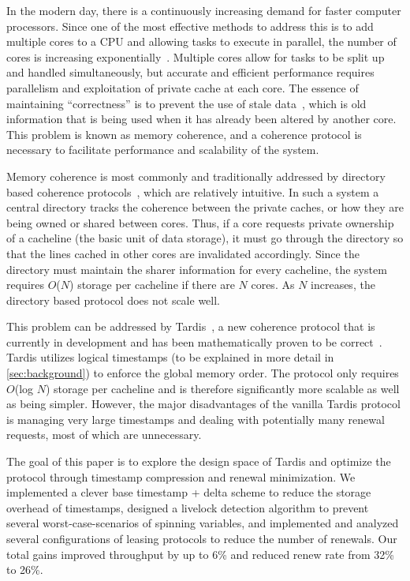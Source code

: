 \documentclass[12pt]{article}
\begin{document}
In the modern day, there is a continuously increasing demand for 
faster computer processors. Since one of the most effective methods to 
address this is to add multiple cores to a CPU and allowing tasks to 
execute in parallel, the number of cores is increasing 
exponentially~\cite{tilera, xeonphi}. 
% 
Multiple cores allow for tasks to be split up and handled 
simultaneously, but accurate and efficient performance requires 
parallelism and exploitation of private cache at each core.  The 
essence of maintaining ``correctness'' is to prevent the use of stale 
data~\cite{lamport1978}, which is old information that is being used 
when it has already been altered by another core. This problem is 
known as memory coherence, and a coherence protocol is necessary to 
facilitate performance and scalability of the system.

Memory coherence is most commonly and traditionally addressed by 
directory based coherence protocols~\cite{censier1978, tang1976}, 
which are relatively intuitive. In such a system a central directory
tracks the coherence between the private caches, or how they are being
owned or shared between cores. Thus, if a core requests private
ownership of a cacheline (the basic unit of data storage), it must
go through the directory so that the lines cached in other cores are 
invalidated accordingly. Since the directory must maintain the sharer 
information for every cacheline, the system requires $O$($N$) storage per 
cacheline if there are $N$ cores.  As $N$ increases, the directory based 
protocol does not scale well.

This problem can be addressed by Tardis~\cite{tardis}, a new coherence 
protocol that is currently in development and has been mathematically 
proven to be correct~\cite{tardis-proof}. Tardis utilizes logical 
timestamps (to be explained in more detail in \cref{sec:background}) to enforce 
the global memory order. The protocol only requires $O$(log $N$) storage 
per cacheline and is therefore significantly more scalable as well as 
being simpler. However, the major disadvantages of the vanilla Tardis 
protocol is managing very large timestamps and dealing with 
potentially many renewal requests, most of which are unnecessary. 

The goal of this paper is to explore the design space of Tardis and 
optimize the protocol through timestamp compression and renewal 
minimization. We implemented a clever base timestamp + delta scheme to 
reduce the storage overhead of timestamps, designed a livelock 
detection algorithm to prevent several worst-case-scenarios of 
spinning variables, and implemented and analyzed several 
configurations of leasing protocols to reduce the number of renewals. Our total gains improved throughput by up to 6\% and reduced renew rate from 32\% to 26\%.
\end{document}
